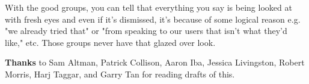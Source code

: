 With the good groups,
                    you can tell that everything you say is being looked at with
                    fresh eyes and even if it's dismissed, it's because of some
                    logical reason e.g. "we already tried that" or "from
                    speaking to our users that isn't what they'd like," etc.
                    Those groups never have that glazed over look.



\textbf{Thanks}
                    to Sam Altman, Patrick Collison, Aaron Iba, Jessica
                    Livingston, Robert Morris, Harj Taggar, and Garry Tan for
                    reading drafts of this.



              
            
          
            
              
                


                  
              
            
          
